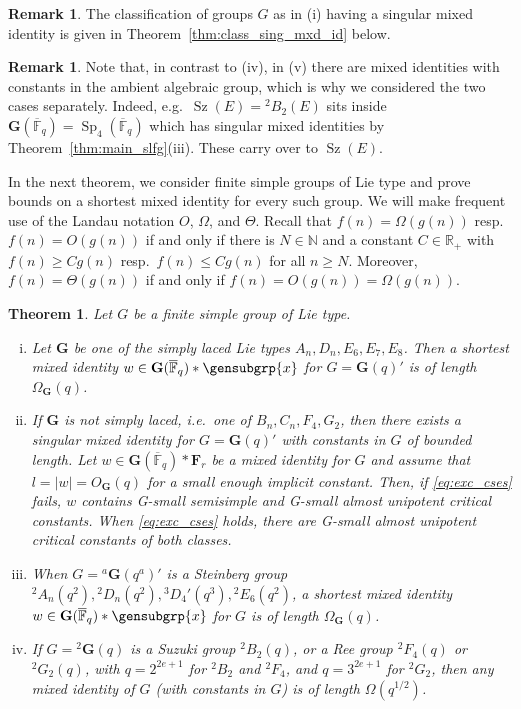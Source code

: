 \documentclass[a4paper,12pt]{amsproc}
\newcommand{\norm}[1]{\left\lvert#1\right\rvert}%
\DeclareMathOperator{\Sp}{Sp}%
\DeclareMathOperator{\Sz}{Sz}%
\theoremstyle{plain}
\newtheorem{theorem}[definition]{Theorem}
\theoremstyle{definition}
\newtheorem{remark}[definition]{Remark}
\begin{document}
\begin{remark}
The classification of groups $G$ as in (i) having a singular mixed identity is given in Theorem~\ref{thm:class_sing_mxd_id} below. 
\end{remark}

\begin{remark}
Note that, in contrast to (iv), in (v) there are mixed identities with constants in the ambient algebraic group, which is why we considered the two cases separately. Indeed, e.g.\ $\Sz(E)={}^2B_2(E)$ sits inside $\mathbf{G}(\overline{\mathbb{F}}_q)=\Sp_4(\overline{\mathbb{F}}_q)$ which has singular mixed identities by Theorem~\ref{thm:main_slfg}(iii). These carry over to $\Sz(E)$. 
\end{remark}

In the next theorem, we consider finite simple groups of Lie type and prove bounds on a shortest mixed identity for every such group. We will make frequent use of the Landau notation $O$, $\Omega$, and $\Theta$. Recall that $f(n)=\Omega(g(n))$ resp.\ $f(n)=O(g(n))$ if and only if there is $N\in\mathbb{N}$ and a constant $C\in\mathbb{R}_+$ with $f(n)\geq Cg(n)$ resp.\ $f(n)\leq Cg(n)$ for all $n\geq N$.
Moreover, $f(n)=\Theta(g(n))$ if and only if $f(n)=O(g(n))=\Omega(g(n))$.

\begin{theorem}\label{thm:main_fin}
Let $G$ be a finite simple group of Lie type.
\begin{enumerate}[(i)]
\item Let $\mathbf{G}$ be one of the simply laced Lie types $A_n,D_n,E_6,E_7,E_8$.
Then a shortest mixed identity $w\in\mathbf{G}(\overline{\mathbb{F}}_q)\ast\gensubgrp{x}$ for $G=\mathbf{G}(q)'$ is of length $\Omega_{\mathbf{G}}(q)$.
\item If $\mathbf{G}$ is not simply laced, i.e.\ one of $B_n,C_n,F_4, G_2$, 
then there exists a singular mixed identity for $G=\mathbf{G}(q)'$ with constants in $G$ of bounded length. Let $w\in\mathbf{G}(\overline{\mathbb{F}}_q)\ast\mathbf{F}_r$ be a mixed identity for $G$ and assume that $l=\norm{w}=O_{\mathbf{G}}(q)$ for a small enough implicit constant. Then, if \eqref{eq:exc_cses} fails, $w$ contains G-small semisimple and G-small almost unipotent critical constants. When \eqref{eq:exc_cses} holds, there are G-small almost unipotent critical constants of both classes.
\item When $G={}^a\mathbf{G}(q^a)'$ is a Steinberg group ${}^2A_n(q^2),{}^2D_n(q^2),{}^3D_4'(q^3),{}^2E_6(q^2)$, a shortest mixed identity $w\in\mathbf{G}(\overline{\mathbb{F}}_q)\ast\gensubgrp{x}$ for $G$ is of length $\Omega_{\mathbf{G}}(q)$.
\item If $G = {}^2\mathbf{G}(q)$ is a Suzuki group ${}^2B_2(q)$, or a Ree group ${}^2F_4(q)$ or ${}^2G_2(q)$, with $q=2^{2e+1}$ for ${}^2B_2$ and ${}^2F_4$, and $q=3^{2e+1}$ for ${}^2G_2$, then any mixed identity of $G$ (with constants in $G$) is of length $\Omega(q^{1/2})$.
\end{enumerate}
\end{theorem}
\end{document}
